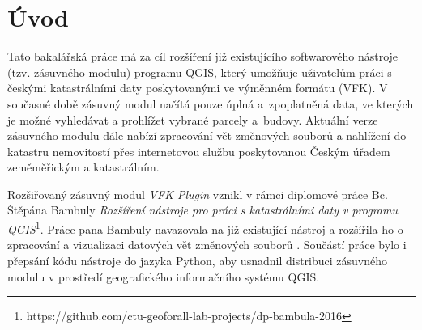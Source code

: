 \chapter{Úvod}
\label{1-uvod}
Tato bakalářská práce má za cíl rozšíření již existujícího
softwarového nástroje (tzv. zásuvného modulu) programu QGIS, který umožňuje
uživatelům práci s českými katastrálními daty poskytovanými ve výměnném
formátu (VFK). V současné době zásuvný modul načítá pouze úplná
a~zpoplatněná data, ve kterých je možné vyhledávat a prohlížet vybrané
parcely a~budovy. Aktuální verze zásuvného modulu dále nabízí
zpracování vět změnových souborů a nahlížení do katastru nemovitostí
přes internetovou službu poskytovanou Českým úřadem zeměměřickým a
katastrálním.





Rozšiřovaný zásuvný modul \textit{VFK Plugin} vznikl v rámci diplomové
práce Bc. Štěpána Bambuly \textit{Rozšíření nástroje pro práci s
  katastrálními daty v programu
  QGIS}\footnote{https://github.com/ctu-geoforall-lab-projects/dp-bambula-2016}. Práce
pana Bambuly navazovala na již existující nástroj a rozšířila ho o
zpracování a vizualizaci datových vět změnových souborů
. Součástí práce bylo i přepsání kódu nástroje do jazyka
Python, aby usnadnil distribuci zásuvného modulu v prostředí
geografického informačního systému QGIS.

